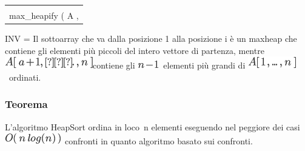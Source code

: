 \documentclass{article}
\begin{document}
\begin{longtable}[]{@{}l@{}}
\begin{minipage}[t]{0.97\columnwidth}
{-= }{1}{\\
\hspace*{0.333em}\hspace*{0.333em}\hspace*{0.333em}\hspace*{0.333em}\hspace*{0.333em}\hspace*{0.333em}\hspace*{0.333em}\hspace*{0.333em}\hspace*{0.333em}\hspace*{0.333em}\hspace*{0.333em}\hspace*{0.333em}\hspace*{0.333em}\hspace*{0.333em}\hspace*{0.333em}\hspace*{0.333em}max\_heapify
( A , }{1}{~)}\strut
\end{minipage}\tabularnewline
\bottomrule
\end{longtable}

{}

{INV = Il sottoarray che va dalla posizione 1 alla posizione i è un
maxheap che contiene gli elementi più piccoli del intero vettore di
partenza, mentre }\includegraphics{images/image138.png}{contiene gli
}\includegraphics{images/image139.png}{~elementi più grandi di
}\includegraphics{images/image140.png}{~}{ordinati}{.}

\hypertarget{h.rdu8s741ww8w}{\subsubsection{\texorpdfstring{{Teorema}}{Teorema}}\label{h.rdu8s741ww8w}}

{L'algoritmo HeapSort ordina }{in loco}{~n elementi eseguendo nel
peggiore dei casi }\includegraphics{images/image141.png}{~confronti in
quanto algoritmo }{basato sui confronti}{.}
\end{document}
